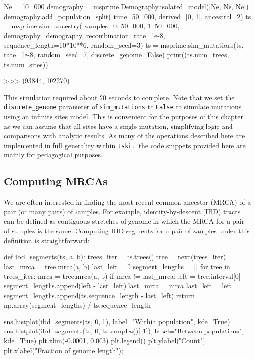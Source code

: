 \documentclass[graybox]{svmult}
\newcommand{\tskit}[0]{\texttt{tskit}}
\begin{document}
\begin{pythoncode}
Ne = 10_000
demography = msprime.Demography.isolated_model([Ne, Ne, Ne])
demography.add_population_split(
    time=50_000, derived=[0, 1], ancestral=2)
ts = msprime.sim_ancestry(
    samples={0: 50_000, 1: 50_000},
    demography=demography, recombination_rate=1e-8,
    sequence_length=10*10**6, random_seed=3)
ts = msprime.sim_mutations(ts, rate=1e-8, 
    random_seed=7, discrete_genome=False)
print((ts.num_trees, ts.num_sites))

>>> (93844, 102270)
\end{pythoncode}

This simulation required about 20 seconds to complete. Note that we set the
\texttt{discrete\_genome} parameter of \texttt{sim\_mutations} to
\texttt{False} to simulate mutations using an infinite sites model.
This is convenient for the purposes of this chapter as we can assume
that all sites have a single mutation, simplifying logic 
and comparisons with analytic results. As many
of the operations described here are implemented in full generality
within \tskit\, the code snippets provided here are mainly for pedagogical
purposes.

\subsection{Computing MRCAs}\label{computing-mrcas}
We are often interested in finding the most recent common ancestor (MRCA)
of a pair (or many pairs) of samples. For example, identity-by-descent
(IBD) tracts can be defined as contiguous stretches of genome in which the
MRCA for a pair of samples is the same. Computing IBD segments for a
pair of samples under this definition is straightforward:

\begin{pythoncode}
def ibd_segments(ts, a, b):
    trees_iter = ts.trees()
    tree = next(trees_iter)
    last_mrca = tree.mrca(a, b)
    last_left = 0
    segment_lengths = []
    for tree in trees_iter:
        mrca = tree.mrca(a, b)
        if mrca != last_mrca:
            left = tree.interval[0]
            segment_lengths.append(left - last_left)
            last_mrca = mrca
            last_left = left
    segment_lengths.append(ts.sequence_length - last_left)
    return np.array(segment_lengths) / ts.sequence_length

sns.histplot(ibd_segments(ts, 0, 1),
    label="Within population", kde=True)
sns.histplot(ibd_segments(ts, 0, ts.samples()[-1]),
    label="Between populations", kde=True)
plt.xlim(-0.0001, 0.003)
plt.legend()
plt.ylabel("Count")
plt.xlabel("Fraction of genome length");
\end{pythoncode}
\end{document}
